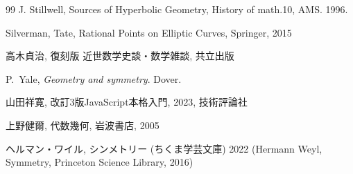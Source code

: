 \documentclass[book, paper=a4paper, 12pt]{jlreq}
\theoremstyle{definition}
\theoremstyle{remark}
\begin{document}
\begin{thebibliography}{99}
J. Stillwell, 
      Sources of Hyperbolic Geometry, History of math.10, AMS. 1996.

    Silverman, Tate,
   Rational Points on Elliptic Curves, Springer, 2015 
  

   高木貞治, 復刻版 近世数学史談・数学雑談, 共立出版

P.~Yale,
\newblock \textit{Geometry and symmetry}.
\newblock  Dover.

      山田祥寛, 
      改訂3版JavaScript本格入門, 2023, 技術評論社

 上野健爾, 代数幾何, 岩波書店, 2005

ヘルマン・ワイル, シンメトリー (ちくま学芸文庫) 2022
(Hermann Weyl, Symmetry, Princeton Science Library, 2016)
\end{thebibliography}

\printindex
\end{document}
